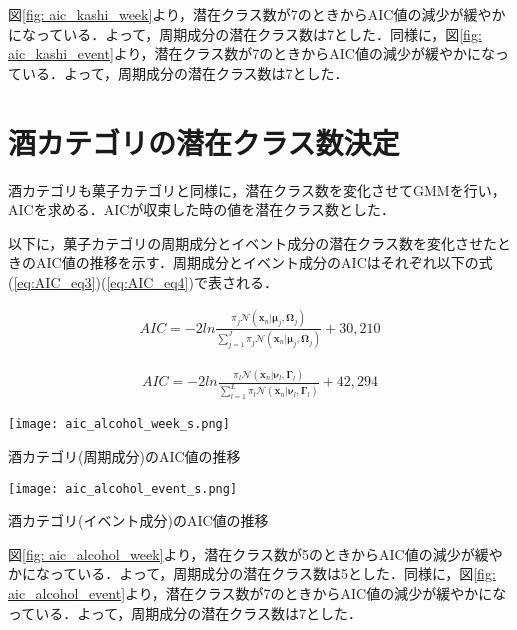 \newpage

図\ref{fig: aic_kashi_week}より，潜在クラス数が7のときからAIC値の減少が緩やかになっている．よって，周期成分の潜在クラス数は7とした．同様に，図\ref{fig: aic_kashi_event}より，潜在クラス数が7のときからAIC値の減少が緩やかになっている．よって，周期成分の潜在クラス数は7とした．

\section{酒カテゴリの潜在クラス数決定}
酒カテゴリも菓子カテゴリと同様に，潜在クラス数を変化させてGMMを行い，AICを求める．AICが収束した時の値を潜在クラス数とした．\par
以下に，菓子カテゴリの周期成分とイベント成分の潜在クラス数を変化させたときのAIC値の推移を示す．周期成分とイベント成分のAICはそれぞれ以下の式(\ref{eq:AIC_eq3})(\ref{eq:AIC_eq4})で表される．

\begin{eqnarray}
\label{eq:AIC_eq3}
 AIC = - 2 ln\frac{\pi_{j} \mathcal{N}({\bm x}_n|{\bm \mu}_{j},{\bm \Omega}_{j})}{\sum^{J}_{j=1}\pi_{j} \mathcal{N}({\bm x}_n|{\bm \mu}_{j},{\bm \Omega}_{j})} + 30,210
\end{eqnarray}

\begin{eqnarray}
\label{eq:AIC_eq4}
 AIC = - 2 ln\frac{\pi_{l} \mathcal{N}({\bm x}_n|{\bm \nu}_{l},{\bm \Gamma}_{l})}{\sum^{L}_{l=1}\pi_{l} \mathcal{N}({\bm x}_n|{\bm \nu}_{l},{\bm \Gamma}_{l})} + 42,294
\end{eqnarray}

\begin{center}
\begin{figurehere}
\texttt{[image: aic\_alcohol\_week\_s.png]}
\caption{酒カテゴリ(周期成分)のAIC値の推移}
\label{fig: aic_alcohol_week}
\end{figurehere}
\end{center}
\begin{center}
\begin{figurehere}
\texttt{[image: aic\_alcohol\_event\_s.png]}
\caption{酒カテゴリ(イベント成分)のAIC値の推移}
\label{fig: aic_alcohol_event}
\end{figurehere}
\end{center}\par

図\ref{fig: aic_alcohol_week}より，潜在クラス数が5のときからAIC値の減少が緩やかになっている．よって，周期成分の潜在クラス数は5とした．同様に，図\ref{fig: aic_alcohol_event}より，潜在クラス数が7のときからAIC値の減少が緩やかになっている．よって，周期成分の潜在クラス数は7とした．
